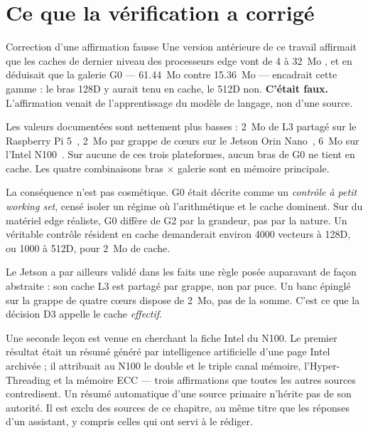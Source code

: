 \documentclass[11pt,a4paper]{article}
\begin{document}
\section{Ce que la vérification a corrigé}\label{sec:correction}

\begin{correction}{Correction d'une affirmation fausse}
Une version antérieure de ce travail affirmait que les caches de dernier niveau des
processeurs edge vont \og de 4 à \num{32}~Mo \fg, et en déduisait que la
galerie G0 — \num{61,44}~Mo contre \num{15,36}~Mo — encadrait cette
gamme : le bras 128D y aurait tenu en cache, le 512D non. \textbf{C'était faux.}
L'affirmation venait de l'apprentissage du modèle de langage, non d'une source.
\end{correction}

Les valeurs documentées sont nettement plus basses : \num{2}~Mo de L3 partagé
sur le Raspberry Pi 5~\cite{rpidoc}, \num{2}~Mo par grappe de cœurs sur le
Jetson Orin Nano~\cite{ridgerun}, \num{6}~Mo sur l'Intel N100~\cite{nbcheck}.
Sur aucune de ces trois plateformes, aucun bras de G0 ne tient en cache. Les quatre
combinaisons bras × galerie sont en mémoire principale.

La conséquence n'est pas cosmétique. G0 était décrite comme un
\emph{contrôle à petit working set}, censé isoler un régime où l'arithmétique et le
cache dominent. Sur du matériel edge réaliste, G0 diffère de G2 par la grandeur, pas
par la nature. Un véritable contrôle résident en cache demanderait environ
\num{4000} vecteurs à 128D, ou \num{1000} à 512D, pour \num{2}~Mo de cache.

Le Jetson a par ailleurs validé dans les faits une règle posée auparavant de façon
abstraite : son cache L3 est partagé par grappe, non par puce. Un banc épinglé sur
la grappe de quatre cœurs dispose de \num{2}~Mo, pas de la somme. C'est ce
que la décision D3 appelle le cache \emph{effectif}.

Une seconde leçon est venue en cherchant la fiche Intel du N100. Le premier résultat
était un résumé généré par intelligence artificielle d'une page Intel archivée ; il
attribuait au N100 le double et le triple canal mémoire, l'Hyper-Threading et la
mémoire ECC — trois affirmations que toutes les autres sources contredisent. Un
résumé automatique d'une source primaire n'hérite pas de son autorité. Il est exclu
des sources de ce chapitre, au même titre que les réponses d'un assistant, y
compris celles qui ont servi à le rédiger.
\end{document}
